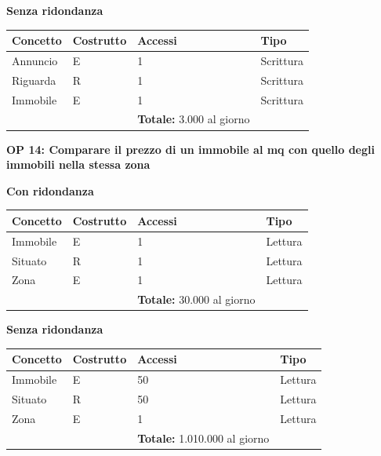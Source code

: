 \documentclass[a4paper,12pt]{report}
\begin{document}
            \begin{center}
                \textbf{Senza ridondanza}
            \end{center}
            \begin{table}[H]
            \centering
            \begin{tabular}{llll}
            \rowcolor{green!20} \textbf{Concetto} & \textbf{Costrutto} & \textbf{Accessi} & \textbf{Tipo} \\ [0.5ex] 
            \hline
            Annuncio & E & 1 & Scrittura \\ 
            Riguarda & R & 1 & Scrittura \\ 
            Immobile & E & 1 & Scrittura \\ 
            \hline
            \rowcolor{green!20}  &   & \textbf{Totale:}  3.000 al giorno &  \\ [1ex] 
            \end{tabular}
            \end{table}
        	\noindent
            \textbf{OP 14: Comparare il prezzo di un immobile al mq con quello degli immobili nella stessa zona}
        	\begin{center}
                \textbf{Con ridondanza}
            \end{center}
            \begin{table}[H]
            \centering
             \begin{tabular}{llll}
             \rowcolor{yellow!20} \textbf{Concetto} & \textbf{Costrutto} & \textbf{Accessi} & \textbf{Tipo}\\ [0.5ex] 
             \hline
             Immobile & E & 1 & Lettura \\ 
             Situato & R & 1 & Lettura \\ 
             Zona & E & 1 & Lettura \\ 
             \hline
                \rowcolor{yellow!20} &   & \textbf{Totale:}  30.000 al giorno &  \\ [1ex] 
             
             \end{tabular}
            \end{table}
        	\begin{center}
                \textbf{Senza ridondanza}
            \end{center}
            \begin{table}[H]
            \centering
             \begin{tabular}{llll}
             \rowcolor{green!20} \textbf{Concetto} & \textbf{Costrutto} & \textbf{Accessi} & \textbf{Tipo}\\ [0.5ex] 
             \hline
             Immobile & E & 50 & Lettura \\ 
             Situato & R & 50 & Lettura \\ 
             Zona & E & 1 & Lettura \\ 
             \hline
                \rowcolor{green!20} &   & \textbf{Totale:}  1.010.000 al giorno &  \\ [1ex] 
             
             \end{tabular}
            \end{table}
\end{document}

